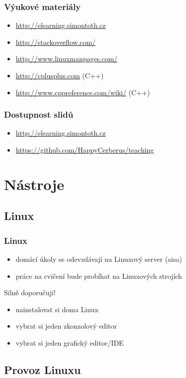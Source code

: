 \begin{frame}
	\frametitle{Výukové materiály}
	\begin{itemize}
		\item{\url{http://elearning.simontoth.cz}}
		\item{\url{http://stackoverflow.com/}}
		\item{\url{http://www.linuxmanpages.com/}}
		\item{\url{http://cplusplus.com} (C++)}
		\item{\url{http://www.cppreference.com/wiki/} (C++)}
	\end{itemize}
\end{frame}

\begin{frame}
	\frametitle{Dostupnost slidů}
		\begin{itemize}
			\item{\url{http://elearning.simontoth.cz}}
			\item{\url{https://github.com/HappyCerberus/teaching}}
		\end{itemize}
	\end{frame}

	\section{Nástroje}
	\subsection{Linux}

	\begin{frame}
		\frametitle{Linux}
		\begin{itemize}
			\item{domácí úkoly se odevzdávají na Linuxový server (aisa)}
			\item{práce na cvičení bude probíhat na Linuxových strojích}
		\end{itemize}
		\begin{block}{Silně doporučuji!}
			\begin{itemize}
			\item{nainstalovat si doma Linux}
			\item{vybrat si jeden zkonzolový editor}
			\item{vybrat si jeden grafický editor/IDE}
			\end{itemize}
		\end{block}
	\end{frame}

	\subsection{Provoz Linuxu}

